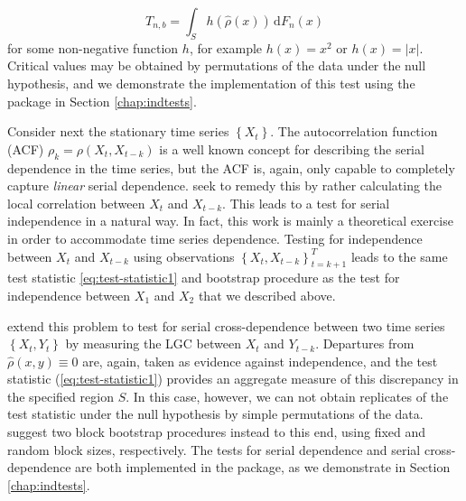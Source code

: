 \begin{equation}
T_{n,b} = \int_S h\left(\widehat \rho\left(x\right) \right) \,\textrm{d}F_n(x)
\label{eq:test-statistic1}
\end{equation}
for some non-negative function $h$, for example $h\left(x\right) = x^2$ or $h\left(x\right) = |x|$. Critical values may be obtained by permutations of the data under the null hypothesis, and we demonstrate the implementation of this test using the  package in Section \ref{chap:indtests}.

Consider next the stationary time series $\left\{X_t\right\}$. The autocorrelation function (ACF) $\rho_k = \rho\left(X_t, X_{t-k}\right)$ is a well known concept for describing the serial dependence in the time series, but the ACF is, again, only capable to completely capture \emph{linear} serial dependence. \citet{laca:tjos:2017} seek to remedy this by rather calculating the local correlation between $X_t$ and $X_{t-k}$. This leads to a test for serial independence in a natural way. In fact, this work is mainly a theoretical exercise in order to accommodate time series dependence. Testing for independence between $X_t$ and $X_{t-k}$ using observations $\left\{X_t, X_{t-k}\right\}_{t = k+1}^T$ leads to the same test statistic \eqref{eq:test-statistic1} and bootstrap procedure as the test for independence between $X_1$ and $X_2$ that we described above. 

\citet{laca:tjos:2018} extend this problem to test for serial cross-dependence between two time series $\left\{X_t, Y_t\right\}$ by measuring the LGC between $X_t$ and $Y_{t-k}$. Departures from $\widehat\rho\left(x,y\right) \equiv 0$ are, again, taken as evidence against independence, and the test statistic (\ref{eq:test-statistic1}) provides an aggregate measure of this discrepancy in the specified region $S$. In this case, however, we can not obtain replicates of the test statistic under the null hypothesis by simple permutations of the data. \citet{laca:tjos:2018} suggest two block bootstrap procedures instead to this end, using fixed and random block sizes, respectively. The tests for serial dependence and serial cross-dependence are both implemented in the  package, as we demonstrate in Section \ref{chap:indtests}.

